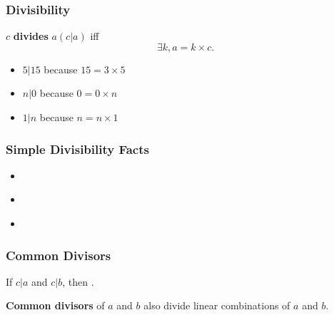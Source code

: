 \documentclass{beamer}
\begin{document}
\begin{frame}
  \frametitle{Divisibility}

  {\larger
    $c$ {\bf divides} $a (c|a)$ iff
    \begin{equation*}
      \exists k, a = k\times c.
    \end{equation*}

  \bigskip
  
  \begin{itemize}
  \item $5 | 15$ because $15 = 3 \times 5$
  \item $n | 0$ because $0 = 0 \times n$
  \item $1 | n$ because $n = n \times 1$
  \end{itemize}
  }
\end{frame}

\begin{frame}
  \frametitle{Simple Divisibility Facts}

  {\larger
    \begin{itemize}
    \item {}\\
    \item {}\\
    \item {}\\

      \bigskip
      
      
    \end{itemize}
  }
\end{frame}

\begin{frame}
  \frametitle{Common Divisors}

  {\larger
    If $c|a$ and $c|b$, then .

    \bigskip

    {\bf Common divisors} of $a$ and $b$ also divide linear combinations of
    $a$ and $b$.
  }
\end{frame}
\end{document}
